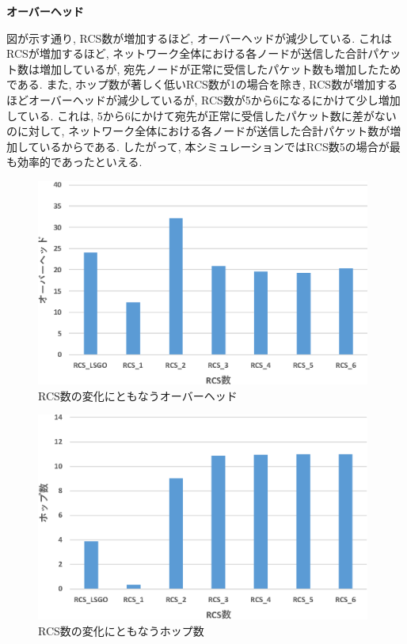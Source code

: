 \documentclass[10pt]{jreport}
\begin{document}
\par
\vspace{5mm}
\noindent
\textbf{オーバーヘッド}
\vspace{5mm}

図が示す通り, RCS数が増加するほど, オーバーヘッドが減少している. これはRCSが増加するほど, ネットワーク全体における各ノードが送信した合計パケット数は増加しているが, 宛先ノードが正常に受信したパケット数も増加したためである. また, ホップ数が著しく低いRCS数が1の場合を除き, RCS数が増加するほどオーバーヘッドが減少しているが, RCS数が5から6になるにかけて少し増加している. これは, 5から6にかけて宛先が正常に受信したパケット数に差がないのに対して, ネットワーク全体における各ノードが送信した合計パケット数が増加しているからである. したがって, 本シミュレーションではRCS数5の場合が最も効率的であったといえる. 

\begin{figure}[!ht]
	\centering
	\includegraphics[width=110mm]{figures/RCS_Overhead.eps}
	\caption{RCS数の変化にともなうオーバーヘッド}
	\label{fig:RCS-overhead}
\end{figure}

\begin{figure}[!ht]
	\centering
	\includegraphics[width=110mm]{figures/RCS_Hop.eps}
	\caption{RCS数の変化にともなうホップ数}
	\label{fig:RCS-hop}
\end{figure}
\end{document}
